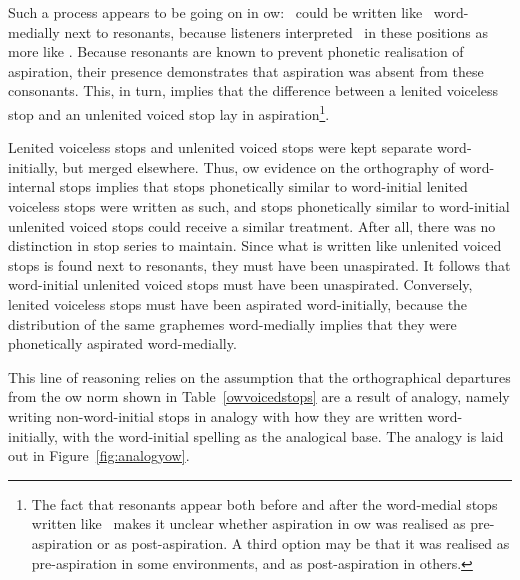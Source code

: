 Such a process appears to be going on in \gls{ow}: \lT\  could be written like \xD\ word-medially next to resonants, because listeners interpreted \lT\ in these positions as more like \xD. Because resonants are known to prevent phonetic realisation of aspiration, their presence demonstrates that  aspiration was absent from these consonants. This, in turn, implies that the difference between a lenited voiceless stop and an unlenited voiced stop lay in aspiration\footnote{The fact that resonants appear both before and after the word-medial stops written like \xD\ makes it unclear whether  aspiration in \gls{ow} was realised as pre-aspiration or as  post-aspiration. A third option may be that it was realised as pre-aspiration in some environments, and as post-aspiration in others.}.

Lenited voiceless stops and unlenited voiced stops were kept separate word-initially, but merged elsewhere. Thus, \gls{ow} evidence on the orthography of word-internal stops implies that stops phonetically similar to word-initial lenited voiceless stops were written as such, and stops phonetically similar to word-initial unlenited voiced stops could receive a similar treatment. After all, there was no distinction in stop series to maintain. Since what is written like unlenited voiced stops is found next to resonants, they must have been unaspirated. It follows that word-initial unlenited voiced stops must have been unaspirated. Conversely, lenited voiceless stops must have been aspirated  word-initially, because the distribution of the same graphemes word-medially implies that they were phonetically aspirated word-medially.

This line of reasoning relies on the assumption that the orthographical departures from the \gls{ow} norm shown in Table~\ref{owvoicedstops} are a result of analogy, namely writing non-word-initial stops in analogy with how they are written word-initially, with the word-initial spelling as the analogical base. The analogy is laid out in Figure~\ref{fig:analogyow}.

